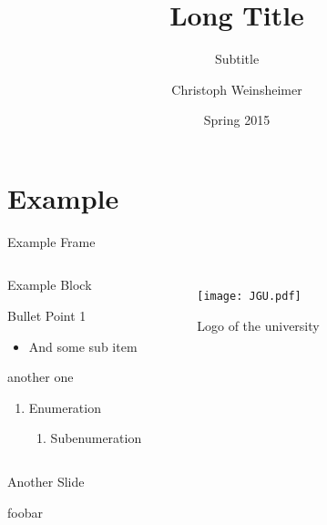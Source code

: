 \documentclass{beamer}
\title[Short Title]{Long Title}
\subtitle{Subtitle}
\author{Christoph Weinsheimer}
\institute[Uni Mainz]
{%
    Johannes Gutenberg-University Mainz
}
\date{Spring 2015}
\begin{document}
\maketitle



\section{Example}

\begin{frame}{Example Frame}
  \begin{columns}
      \begin{block}{Example Block}
        \begin{wideitemize}
          \item Bullet Point 1
            \begin{itemize}
              \item And some sub item
            \end{itemize}
          \item another one
        \end{wideitemize}
        \begin{enumerate}
          \item Enumeration
            \begin{enumerate}
              \item Subenumeration
            \end{enumerate}
        \end{enumerate}
      \end{block}
      \begin{figure}[ht]
        \centering
        \texttt{[image: JGU.pdf]}
        \caption{Logo of the university}
      \end{figure}
  \end{columns}
\end{frame}



\begin{frame}{Another Slide}
  \begin{center}
    foobar
  \end{center}
\end{frame}
\end{document}
